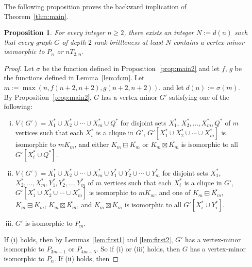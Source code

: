 \documentclass[11pt]{article}
\newtheorem{proposition}[theorem]{Proposition}
\newcommand\mat{\boxminus}
\newcommand\antimat{\boxtimes}
\def\S_#1{\overline{K_{#1}}}
\begin{document}
      The following proposition proves the backward implication
      of Theorem~\ref{thm:main}.
        \begin{proposition}\label{prop:mainprop}
          For every integer $n\ge 2$, there exists an integer $N:=d(n)$ such that 
          every graph $G$ of depth-$2$ rank-brittleness at least  $N$ contains a vertex-minor isomorphic to $P_n$ or $nT_{2,n}$.
        \end{proposition}
        \begin{proof}
          Let $\sigma$ be the function defined in Proposition~\ref{prop:main2}
          and let $f$, $g$ be the functions defined in Lemma~\ref{lem:dcm}.
          Let $m:=\max(n, f(n+2,n+2),g(n+2,n+2))$.
          and let $d(n):=\sigma(m)$.
          By Proposition~\ref{prop:main2},
          $G$ has a vertex-minor $G'$ satisfying one of the following:
                \begin{enumerate}[(i)]
                \item $V(G')=X_1^*\cup X_2^*\cup\cdots \cup X_m^*\cup Q^*$
                  for disjoint sets $X_1^*$, $X_2^*,\ldots, X_m^*,Q^*$ of $m$ vertices
                  such
                  that each $X_i^*$ is a clique in $G'$,
                  $G'[X_1^*\cup X_2^*\cup \cdots \cup X_m^*]$ is isomorphic to $mK_m$,
                  and
                  either $K_m\mat \S_m$ or $K_m\antimat \S_m$
                  is isomorphic to all $G'[X_i^*\cup Q^*]$.
                \item $V(G')=X_1^*\cup X_2^*\cup\cdots \cup X_m^*\cup Y_1^*
                  \cup Y_2^*\cup\cdots\cup Y_m^*$
                  for disjoint sets $X_1^*$, $X_2^*,\ldots, X_m^*,Y_1^*,Y_2^*,\ldots,
                  Y_m^*$ of $m$ vertices
                  such
                  that each $X_i^*$ is a clique in $G'$,
                  $G'[X_1^*\cup X_2^*\cup \cdots \cup X_m^*]$ is isomorphic to $m K_m$,
                  and
                  one of  $K_m\mat \S_m$,
                  $K_m\mat K_m$,  $K_m\antimat \S_m$, 
                  and $K_m\antimat K_m$
                  is isomorphic to 
                  all $G'[X_i^*\cup Y_i^*]$.
                \item $G'$ is isomorphic to $P_m$.
                \end{enumerate}
                If (i) holds, then by Lemmas~\ref{lem:first1} and \ref{lem:first2}, $G'$ has a 
                vertex-minor isomorphic to $P_{3m-1}$ or $P_{4m-5}$.  So if (i) or (iii) holds, then 
                $G$ has a vertex-minor isomorphic to $P_n$.
                If (ii) holds, then 

\end{proof}
\end{document}
